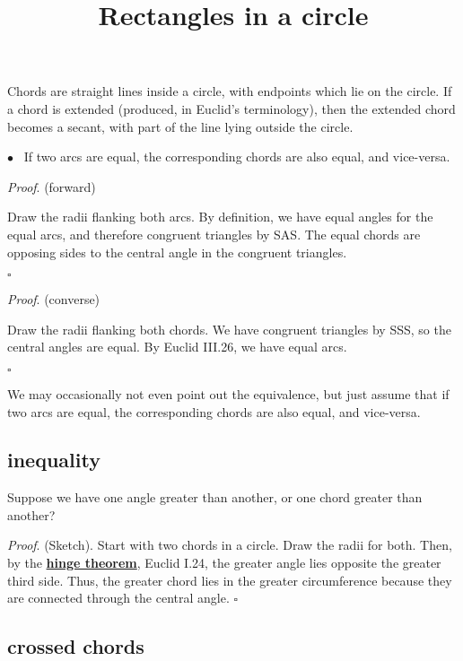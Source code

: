 \documentclass[11pt, oneside]{article}
\title{Rectangles in a circle}
\date{}
\begin{document}
\maketitle
\Large


\label{sec:equal_arcs_equal_chords}

Chords are straight lines inside a circle, with endpoints which lie on the circle.  If a chord is extended (produced, in Euclid's terminology), then the extended chord becomes a secant, with part of the line lying outside the circle.

$\bullet$ \ If two arcs are equal, the corresponding chords are also equal, and vice-versa.

\emph{Proof}.  (forward)

Draw the radii flanking both arcs.  By definition, we have equal angles for the equal arcs, and therefore congruent triangles by SAS.  The equal chords are opposing sides to the central angle in the congruent triangles.

$\square$

\emph{Proof}.  (converse)

Draw the radii flanking both chords.  We have congruent triangles by SSS, so the central angles are equal.  By Euclid III.26, we have equal arcs.

$\square$

We may occasionally not even point out the equivalence, but just assume that if two arcs are equal, the corresponding chords are also equal, and vice-versa.

\subsection*{inequality}

Suppose we have one angle greater than another, or one chord greater than another?

\emph{Proof}.  (Sketch).  Start with two chords in a circle.  Draw the radii for both.  Then, by the \hyperref[sec:hinge_theorem]{\textbf{hinge theorem}}, Euclid I.24, the greater angle lies opposite the greater third side.  Thus, the greater chord lies in the greater circumference because they are connected through the central angle.  $\square$

\subsection*{crossed chords}
\end{document}
